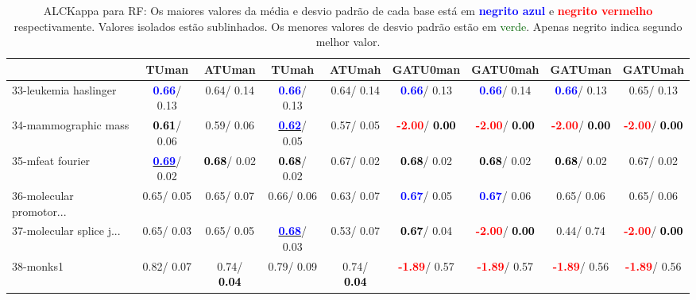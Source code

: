 \begin{table}[h]
\caption{ALCKappa para RF: Os maiores valores da média e desvio padrão de cada base está em \textcolor{blue}{\textbf{negrito azul}} e \textcolor{red}{\textbf{negrito vermelho}} respectivamente. Valores isolados estão sublinhados. Os menores valores de desvio padrão estão em \textcolor{darkgreen}{verde}. Apenas negrito indica segundo melhor valor.}
\begin{center}\begin{tabular}{lc|c|c|c|c|c|c|c}
 & TUman & \textbf{ATUman} & TUmah & \textbf{ATUmah} & GATU0man & GATU0mah & GATUman & GATUmah\\ \hline 33-leukemia haslinger & \textcolor{blue}{\textbf{  0.66}}/  0.13 &   0.64/  0.14 & \textcolor{blue}{\textbf{  0.66}}/  0.13 &   0.64/  0.14 & \textcolor{blue}{\textbf{  0.66}}/  0.13 & \textcolor{blue}{\textbf{  0.66}}/  0.14 & \textcolor{blue}{\textbf{  0.66}}/  0.13 &   0.65/  0.13 \\
34-mammographic mass & \textcolor{black}{\textbf{  0.61}}/  0.06 &   0.59/  0.06 & \underline{\textcolor{blue}{\textbf{  0.62}}}/  0.05 &   0.57/  0.05 & \textcolor{red}{\textbf{ -2.00}}/\textcolor{black}{\textbf{  0.00}} & \textcolor{red}{\textbf{ -2.00}}/\textcolor{black}{\textbf{  0.00}} & \textcolor{red}{\textbf{ -2.00}}/\textcolor{black}{\textbf{  0.00}} & \textcolor{red}{\textbf{ -2.00}}/\textcolor{black}{\textbf{  0.00}} \\
35-mfeat fourier & \underline{\textcolor{blue}{\textbf{  0.69}}}/  0.02 & \textcolor{black}{\textbf{  0.68}}/  0.02 & \textcolor{black}{\textbf{  0.68}}/  0.02 &   0.67/  0.02 & \textcolor{black}{\textbf{  0.68}}/  0.02 & \textcolor{black}{\textbf{  0.68}}/  0.02 & \textcolor{black}{\textbf{  0.68}}/  0.02 &   0.67/  0.02 \\
36-molecular promotor... &   0.65/  0.05 &   0.65/  0.07 &   0.66/  0.06 &   0.63/  0.07 & \textcolor{blue}{\textbf{  0.67}}/  0.05 & \textcolor{blue}{\textbf{  0.67}}/  0.06 &   0.65/  0.06 &   0.65/  0.06 \\
37-molecular splice j... &   0.65/  0.03 &   0.65/  0.05 & \underline{\textcolor{blue}{\textbf{  0.68}}}/  0.03 &   0.53/  0.07 & \textcolor{black}{\textbf{  0.67}}/  0.04 & \textcolor{red}{\textbf{ -2.00}}/\textcolor{black}{\textbf{  0.00}} &   0.44/  0.74 & \textcolor{red}{\textbf{ -2.00}}/\textcolor{black}{\textbf{  0.00}} \\
38-monks1 &   0.82/  0.07 &   0.74/\textcolor{black}{\textbf{  0.04}} &   0.79/  0.09 &   0.74/\textcolor{black}{\textbf{  0.04}} & \textcolor{red}{\textbf{ -1.89}}/  0.57 & \textcolor{red}{\textbf{ -1.89}}/  0.57 & \textcolor{red}{\textbf{ -1.89}}/  0.56 & \textcolor{red}{\textbf{ -1.89}}/  0.56 \\

\end{tabular}
\end{center}
\end{table}
